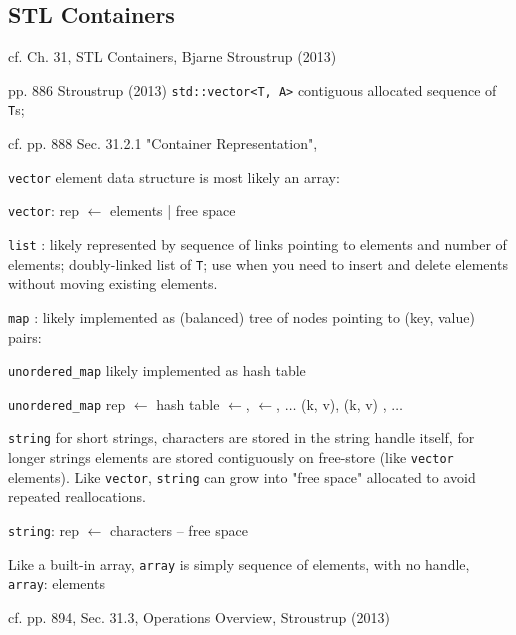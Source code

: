 \documentclass[10pt]{amsart}
\begin{document}
\subsection{STL Containers}

cf. Ch. 31, STL Containers, Bjarne Stroustrup (2013) \cite{Stro2013}

pp. 886 Stroustrup (2013) \cite{Stro2013}
\verb|std::vector<T, A>| contiguous allocated sequence of \verb|T|s;

cf. pp. 888 Sec. 31.2.1 "Container Representation", \cite{Stro2013}

\verb|vector| element data structure is most likely an array:

\verb|vector|: rep $\leftarrow$ elements | free space

\verb|list| : likely represented by sequence of links pointing to elements and number of elements; doubly-linked list of \verb|T|; use when you need to insert and delete elements without moving existing elements.

\verb|map| : likely implemented as (balanced) tree of nodes pointing to (key, value) pairs:

\verb|unordered_map| likely implemented as hash table

\verb|unordered_map| rep $\leftarrow $ hash table $\leftarrow$, $\leftarrow$, $\dots$ (k, v), (k, v) , $\dots$

\verb|string| for short strings, characters are stored in the string handle itself, for longer strings elements are stored contiguously on free-store (like \verb|vector| elements). Like \verb|vector|, \verb|string| can grow into "free space" allocated to avoid repeated reallocations.

\verb|string|: rep $\leftarrow$ characters -- free space

Like a built-in array, \verb|array| is simply sequence of elements, with no handle,
\verb|array|: elements

cf. pp. 894, Sec. 31.3, Operations Overview, Stroustrup (2013) \cite{Stro2013}
\end{document}
